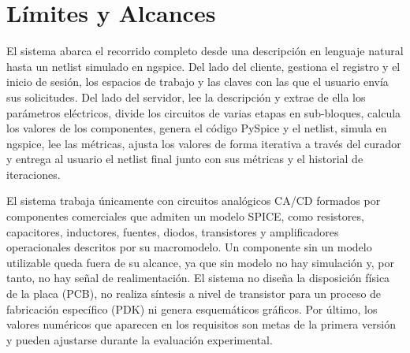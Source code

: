 \section*{Límites y Alcances}

El sistema abarca el recorrido completo desde una descripción en lenguaje natural hasta un netlist simulado en ngspice. Del lado del cliente, gestiona el registro y el inicio de sesión, los espacios de trabajo y las claves con las que el usuario envía sus solicitudes. Del lado del servidor, lee la descripción y extrae de ella los parámetros eléctricos, divide los circuitos de varias etapas en sub-bloques, calcula los valores de los componentes, genera el código PySpice y el netlist, simula en ngspice, lee las métricas, ajusta los valores de forma iterativa a través del curador y entrega al usuario el netlist final junto con sus métricas y el historial de iteraciones.

El sistema trabaja únicamente con circuitos analógicos CA/CD formados por componentes comerciales que admiten un modelo SPICE, como resistores, capacitores, inductores, fuentes, diodos, transistores y amplificadores operacionales descritos por su macromodelo. Un componente sin un modelo utilizable queda fuera de su alcance, ya que sin modelo no hay simulación y, por tanto, no hay señal de realimentación. El sistema no diseña la disposición física de la placa (PCB), no realiza síntesis a nivel de transistor para un proceso de fabricación específico (PDK) ni genera esquemáticos gráficos. Por último, los valores numéricos que aparecen en los requisitos son metas de la primera versión y pueden ajustarse durante la evaluación experimental.

